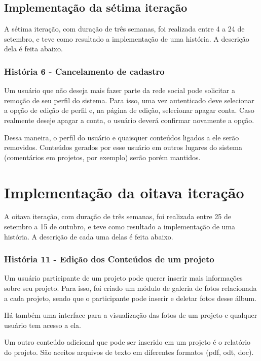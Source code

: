  \subsection{Implementação da sétima iteração}
    A sétima iteração, com duração de três semanas, foi realizada entre 4 a 24 de setembro, e teve como resultado a implementação de uma história. A descrição dela é feita abaixo.

    \subsubsection{História 6 - Cancelamento de cadastro}
      Um usuário que não deseja mais fazer parte da rede social pode solicitar a remoção de seu perfil do sistema. Para isso, uma vez autenticado deve selecionar a opção de edição de perfil e, na página de edição, selecionar apagar conta. Caso realmente deseje apagar a conta, o usuário deverá confirmar novamente a opção.

      Dessa maneira, o perfil do usuário e quaisquer conteúdos ligados a ele serão removidos. Conteúdos gerados por esse usuário em outros lugares do sistema (comentários em projetos, por exemplo) serão porém mantidos.

 \section{Implementação da oitava iteração}
    A oitava iteração, com duração de três semanas, foi realizada entre 25 de setembro a 15 de outubro, e teve como resultado a implementação de uma história. A descrição de cada uma delas é feita abaixo. 

    \subsubsection{História 11 - Edição dos Conteúdos de um projeto}

      Um usuário participante de um projeto pode querer inserir mais informações sobre seu projeto. Para isso, foi criado um módulo de galeria de fotos relacionada a cada projeto, sendo que o participante pode inserir e deletar fotos desse álbum. 
      
      Há também uma interface para a visualização das fotos de um projeto e qualquer usuário tem acesso a ela.

      Um outro conteúdo adicional que pode ser inserido em um projeto é o relatório do projeto. São aceitos arquivos de texto em diferentes formatos (pdf, odt, doc).

